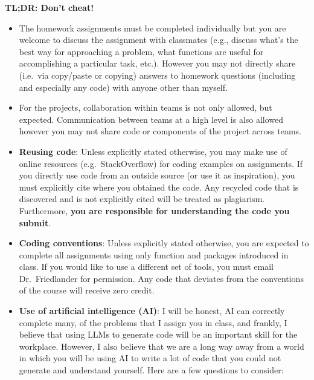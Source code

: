 \documentclass[
  letterpaper,
  DIV=11,
  numbers=noendperiod]{scrartcl}
\begin{document}
\textbf{TL;DR: Don't cheat!}

\begin{itemize}
\item
  The homework assignments must be completed individually but you are
  welcome to discuss the assignment with classmates (e.g., discuss
  what's the best way for approaching a problem, what functions are
  useful for accomplishing a particular task, etc.). However you may not
  directly share (i.e.~via copy/paste or copying) answers to homework
  questions (including and especially any code) with anyone other than
  myself.
\item
  For the projects, collaboration within teams is not only allowed, but
  expected. Communication between teams at a high level is also allowed
  however you may not share code or components of the project across
  teams.
\item
  \textbf{Reusing code}: Unless explicitly stated otherwise, you may
  make use of online resources (e.g.~StackOverflow) for coding examples
  on assignments. If you directly use code from an outside source (or
  use it as inspiration), you must explicitly cite where you obtained
  the code. Any recycled code that is discovered and is not explicitly
  cited will be treated as plagiarism. Furthermore, \textbf{you are
  responsible for understanding the code you submit}.
\item
  \textbf{Coding conventions}: Unless explicitly stated otherwise, you
  are expected to complete all assignments using only function and
  packages introduced in class. If you would like to use a different set
  of tools, you must email Dr.~Friedlander for permission. Any code that
  deviates from the conventions of the course will receive zero credit.
\item
  \textbf{Use of artificial intelligence (AI)}: I will be honest, AI can
  correctly complete many, of the problems that I assign you in class,
  and frankly, I believe that using LLMs to generate code will be an
  important skill for the workplace. However, I also believe that we are
  a long way away from a world in which you will be using AI to write a
  lot of code that you could not generate and understand yourself. Here
  are a few questions to consider:
\end{itemize}
\end{document}
